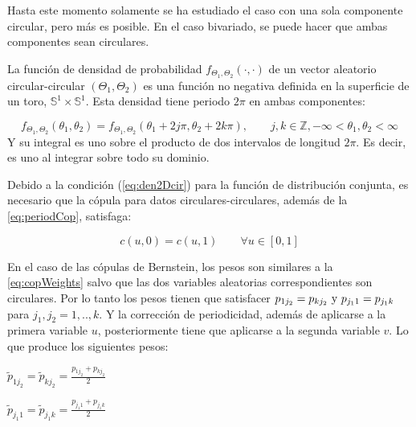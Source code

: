 
Hasta este momento solamente se ha estudiado el caso con una sola componente circular, pero m\'as es posible. En el caso bivariado, se puede hacer que ambas componentes sean circulares.

La funci\'on de densidad de probabilidad \(f_{\Theta_{1},\Theta_{2}}\left( \cdot , \cdot \right)\) de un vector aleatorio circular-circular \(\left( \Theta_{1},\Theta_{2} \right)\) es una funci\'on no negativa definida en la superficie de un toro, \(\mathbb{S}^{1} \times \mathbb{S}^{1}\). Esta densidad tiene periodo \(2\pi\) en ambas componentes:

\begin{equation}
f_{\Theta_{1},\Theta_{2}}\left( \theta_{1},\theta_{2} \right) = f_{\Theta_{1},\Theta_{2}}(\theta_{1} + 2j\pi,\theta_{2} + 2k\pi), \qquad j,k\mathbb{\in Z}, - \infty < \theta_{1},\theta_{2} < \infty 
\label{eq:den2Dcir}
\end{equation}
Y su integral es uno sobre el producto de dos intervalos de longitud \(2\pi\). Es decir, es uno al integrar sobre todo su dominio.

Debido a la condici\'on (\autoref{eq:den2Dcir}) para la funci\'on de distribuci\'on conjunta, es necesario que la c\'opula para datos circulares-circulares, adem\'as de la \autoref{eq:periodCop}, satisfaga:

\begin{equation}
	c(u,0) = c(u,1) \qquad \forall u \in [0,1]
	\label{eq:periodCondition2D}
\end{equation}

En el caso de las c\'opulas de Bernstein, los pesos son similares a la \autoref{eq:copWeights} salvo que las dos variables aleatorias correspondientes son circulares.
Por lo tanto los pesos tienen que satisfacer $p_{1j_{2}} = p_{kj_{2}}\) y \(p_{j_{1}1} = p_{j_{1}k}$ para $j_{1},j_{2} = 1,..,k$.
Y la correcci\'on de periodicidad, adem\'as de aplicarse a la primera variable $u$, posteriormente tiene que aplicarse a la segunda variable $v$. Lo que produce los siguientes pesos:

\({\tilde{p}}_{1j_{2}} = {\tilde{p}}_{kj_{2}} = \frac{p_{1j_{2}} + p_{kj_{2}}}{2}\)

\({\tilde{p}}_{j_{1}1} = {\tilde{p}}_{j_{1}k} = \frac{p_{j_{1}1} + p_{j_{1}k}}{2}\)

